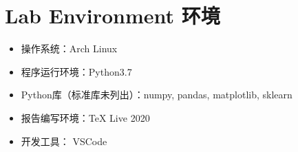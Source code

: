 \section{Lab Environment 环境}
\begin{itemize}
    \item 操作系统：Arch Linux
    \item 程序运行环境：Python3.7
    \item Python库（标准库未列出）：numpy, pandas, matplotlib, sklearn
    \item 报告编写环境：TeX Live 2020
    \item 开发工具： VSCode
\end{itemize}